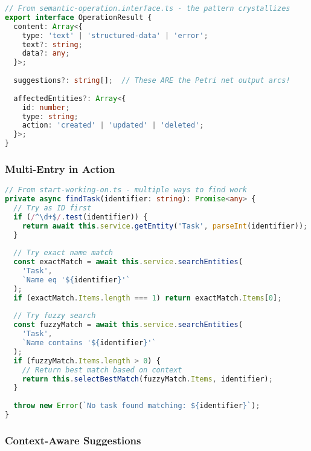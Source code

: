 \documentclass[11pt,a4paper]{article}
\begin{document}
\begin{lstlisting}[language=TypeScript]
// From semantic-operation.interface.ts - the pattern crystallizes
export interface OperationResult {
  content: Array<{
    type: 'text' | 'structured-data' | 'error';
    text?: string;
    data?: any;
  }>;
  
  suggestions?: string[];  // These ARE the Petri net output arcs!
  
  affectedEntities?: Array<{
    id: number;
    type: string;
    action: 'created' | 'updated' | 'deleted';
  }>;
}
\end{lstlisting}

\subsubsection{Multi-Entry in Action}

\begin{lstlisting}[language=TypeScript]
// From start-working-on.ts - multiple ways to find work
private async findTask(identifier: string): Promise<any> {
  // Try as ID first
  if (/^\d+$/.test(identifier)) {
    return await this.service.getEntity('Task', parseInt(identifier));
  }
  
  // Try exact name match
  const exactMatch = await this.service.searchEntities(
    'Task',
    `Name eq '${identifier}'`
  );
  if (exactMatch.Items.length === 1) return exactMatch.Items[0];
  
  // Try fuzzy search
  const fuzzyMatch = await this.service.searchEntities(
    'Task', 
    `Name contains '${identifier}'`
  );
  if (fuzzyMatch.Items.length > 0) {
    // Return best match based on context
    return this.selectBestMatch(fuzzyMatch.Items, identifier);
  }
  
  throw new Error(`No task found matching: ${identifier}`);
}
\end{lstlisting}

\subsubsection{Context-Aware Suggestions}
\end{document}
